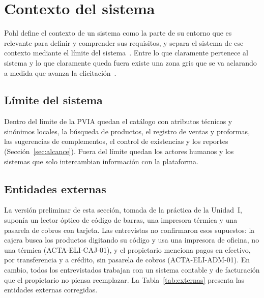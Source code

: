 \section{Contexto del sistema}\label{sec:contexto}

Pohl define el contexto de un sistema como la parte de su entorno que es relevante para definir y comprender sus requisitos, y separa el sistema de ese contexto mediante el límite del sistema~\cite{pohl2025}. Entre lo que claramente pertenece al sistema y lo que claramente queda fuera existe una zona gris que se va aclarando a medida que avanza la elicitación~\cite{pohl2025,ireb2026}.

\subsection{Límite del sistema}

Dentro del límite de la PVIA quedan el catálogo con atributos técnicos y sinónimos locales, la búsqueda de productos, el registro de ventas y proformas, las sugerencias de complementos, el control de existencias y los reportes (Sección~\ref{sec:alcance}). Fuera del límite quedan los actores humanos y los sistemas que solo intercambian información con la plataforma.

\subsection{Entidades externas}

La versión preliminar de esta sección, tomada de la práctica de la Unidad~I, suponía un lector óptico de código de barras, una impresora térmica y una pasarela de cobros con tarjeta. Las entrevistas no confirmaron esos supuestos: la cajera busca los productos digitando su código y usa una impresora de oficina, no una térmica (ACTA-ELI-CAJ-01), y el propietario menciona pagos en efectivo, por transferencia y a crédito, sin pasarela de cobros (ACTA-ELI-ADM-01). En cambio, todos los entrevistados trabajan con un sistema contable y de facturación que el propietario no piensa reemplazar. La Tabla~\ref{tab:externas} presenta las entidades externas corregidas.

